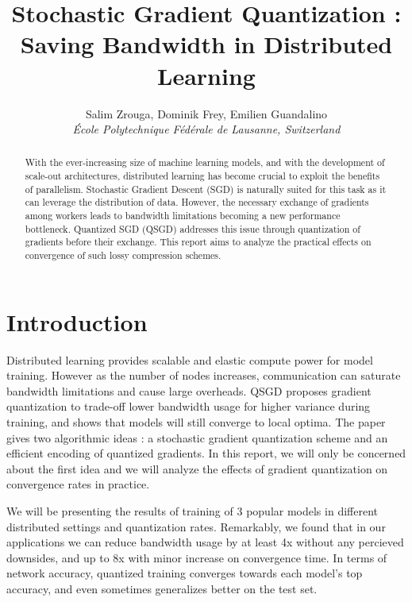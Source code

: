 \documentclass[10pt,conference,compsocconf]{IEEEtran}
\begin{document}
\title{Stochastic Gradient Quantization : \\ Saving Bandwidth in Distributed Learning}

\author{
  Salim Zrouga, Dominik Frey, Emilien Guandalino\\
  \textit{École Polytechnique Fédérale de Lausanne, Switzerland}
}

\maketitle

\begin{abstract}

	With the ever-increasing size of machine learning models, and with the development of scale-out architectures, distributed learning has become crucial to exploit the benefits of parallelism. Stochastic Gradient Descent (SGD) is naturally suited for this task as it can leverage the distribution of data. However, the necessary exchange of gradients among workers leads to bandwidth limitations becoming a new performance bottleneck. Quantized SGD (QSGD) addresses this issue through quantization of gradients before their exchange. This report aims to analyze the practical effects on convergence of such lossy compression schemes.
\end{abstract}

\section{Introduction}

Distributed learning provides scalable and elastic compute power for model training. 
However as the number of nodes increases, communication can saturate bandwidth limitations and cause large overheads.
QSGD \cite{quant} proposes gradient quantization to trade-off lower bandwidth usage for higher variance during training, and shows that models will still converge to local optima. The paper gives two algorithmic ideas : a stochastic gradient quantization scheme and an efficient encoding of quantized gradients. In this report, we will only be concerned about the first idea and we will analyze the effects of gradient quantization on convergence rates in practice.

We will be presenting the results of training of 3 popular models in different distributed settings and quantization rates. Remarkably, we found that in our applications we can reduce bandwidth usage by at least 4x without any percieved downsides, and up to 8x with minor increase on convergence time. In terms of network accuracy, quantized training converges towards each model's top accuracy, and even sometimes generalizes better on the test set.
\end{document}
